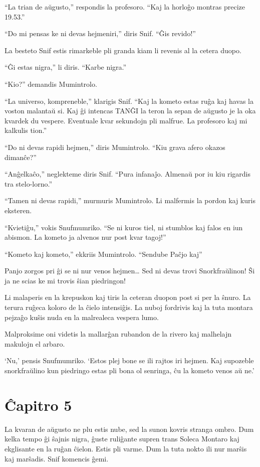 ``La trian de aŭgusto,'' respondis la profesoro. ``Kaj la horloĝo montras precize 19.53.''

``Do mi pensas ke ni devas hejmeniri,'' diris Snif. ``Ĝis revido!''

La besteto Snif estis rimarkeble pli granda kiam li revenis al la cetera duopo.

``Ĝi estas nigra,'' li diris. ``Karbe nigra.''

``Kio?'' demandis Mumintrolo.

``La universo, kompreneble,'' klarigis Snif. ``Kaj la kometo estas ruĝa kaj havas la voston malantaŭ si. Kaj ĝi intencas TANĜI la teron la sepan de aŭgusto je la oka kvardek du vespere. Eventuale kvar sekundojn pli malfrue. La profesoro kaj mi kalkulis tion.''

``Do ni devas rapidi hejmen,'' diris Mumintrolo. ``Kiu grava afero okazos dimanĉe?''

``Anĝelkaĉo,'' neglekteme diris Snif. ``Pura infanaĵo. Almenaŭ por iu kiu rigardis tra stelo-lorno.''

``Tamen ni devas rapidi,'' murmuris Mumintrolo. Li malfermis la pordon kaj kuris eksteren.

``Kvietiĝu,'' vokis Snufmumriko. ``Se ni kuros tiel, ni stumblos kaj falos en iun abismon. La kometo ja alvenos nur post kvar tagoj!''

``Kometo kaj kometo,'' ekkriis Mumintrolo. ``Sendube Paĉjo kaj''

Panjo zorgos pri ĝi se ni nur venos hejmen{\ldots} Sed ni devas trovi Snorkfraŭlinon! Ŝi ja ne scias ke mi trovis ŝian piedringon!

Li malaperis en la krepuskon kaj tiris la ceteran duopon post si per la ŝnuro. La terura ruĝeca koloro de la ĉielo intensiĝis. La nuboj fordrivis kaj la tuta montara pejzaĝo kuŝis nuda en la malrealeca vespera lumo.

Malproksime oni videtis la mallarĝan rubandon de la rivero kaj malhelajn makulojn el arbaro.

`Nu,' pensis Snufmumriko. `Estos plej bone se ili rajtos iri hejmen. Kaj supozeble snorkfraŭlino kun piedringo estas pli bona ol senringa, ĉu la kometo venos aŭ ne.'

\chapter*[Ĉapitro 5]{Ĉapitro 5}


La kvaran de aŭgusto ne plu estis nube, sed la sunon kovris stranga ombro. Dum kelka tempo ĝi ŝajnis nigra, ĝuste ruliĝante supren trans Soleca Montaro kaj ekglisante en la ruĝan ĉielon. Estis pli varme. Dum la tuta nokto ili nur marŝis kaj marŝadis. Snif komencis ĝemi.

